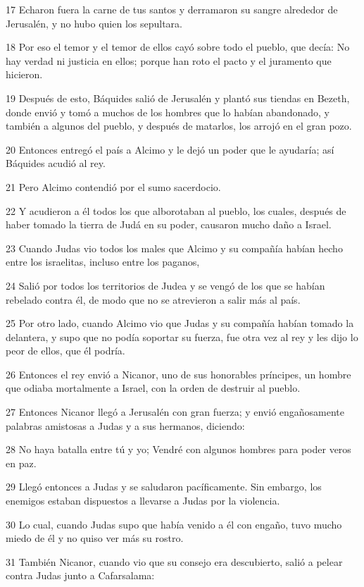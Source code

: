 \par 17 Echaron fuera la carne de tus santos y derramaron su sangre alrededor de Jerusalén, y no hubo quien los sepultara.
\par 18 Por eso el temor y el temor de ellos cayó sobre todo el pueblo, que decía: No hay verdad ni justicia en ellos; porque han roto el pacto y el juramento que hicieron.
\par 19 Después de esto, Báquides salió de Jerusalén y plantó sus tiendas en Bezeth, donde envió y tomó a muchos de los hombres que lo habían abandonado, y también a algunos del pueblo, y después de matarlos, los arrojó en el gran pozo.
\par 20 Entonces entregó el país a Alcimo y le dejó un poder que le ayudaría; así Báquides acudió al rey.
\par 21 Pero Alcimo contendió por el sumo sacerdocio.
\par 22 Y acudieron a él todos los que alborotaban al pueblo, los cuales, después de haber tomado la tierra de Judá en su poder, causaron mucho daño a Israel.
\par 23 Cuando Judas vio todos los males que Alcimo y su compañía habían hecho entre los israelitas, incluso entre los paganos,
\par 24 Salió por todos los territorios de Judea y se vengó de los que se habían rebelado contra él, de modo que no se atrevieron a salir más al país.
\par 25 Por otro lado, cuando Alcimo vio que Judas y su compañía habían tomado la delantera, y supo que no podía soportar su fuerza, fue otra vez al rey y les dijo lo peor de ellos, que él podría.
\par 26 Entonces el rey envió a Nicanor, uno de sus honorables príncipes, un hombre que odiaba mortalmente a Israel, con la orden de destruir al pueblo.
\par 27 Entonces Nicanor llegó a Jerusalén con gran fuerza; y envió engañosamente palabras amistosas a Judas y a sus hermanos, diciendo:
\par 28 No haya batalla entre tú y yo; Vendré con algunos hombres para poder veros en paz.
\par 29 Llegó entonces a Judas y se saludaron pacíficamente. Sin embargo, los enemigos estaban dispuestos a llevarse a Judas por la violencia.
\par 30 Lo cual, cuando Judas supo que había venido a él con engaño, tuvo mucho miedo de él y no quiso ver más su rostro.
\par 31 También Nicanor, cuando vio que su consejo era descubierto, salió a pelear contra Judas junto a Cafarsalama:
